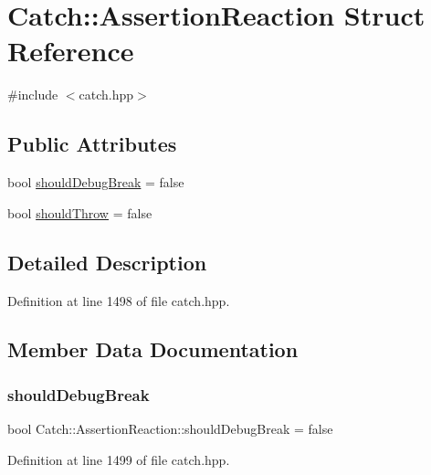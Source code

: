 \hypertarget{struct_catch_1_1_assertion_reaction}{}\section{Catch\+:\+:Assertion\+Reaction Struct Reference}
\label{struct_catch_1_1_assertion_reaction}


{\ttfamily \#include $<$catch.\+hpp$>$}

\subsection*{Public Attributes}
\begin{DoxyCompactItemize}
\item 
bool \mbox{\hyperlink{struct_catch_1_1_assertion_reaction_adcf30fb90ff20d9789df78d424652497}{should\+Debug\+Break}} = false
\item 
bool \mbox{\hyperlink{struct_catch_1_1_assertion_reaction_a82c8d95a2c1b6a331bde66982a8e090f}{should\+Throw}} = false
\end{DoxyCompactItemize}


\subsection{Detailed Description}


Definition at line 1498 of file catch.\+hpp.



\subsection{Member Data Documentation}
\mbox{\label{struct_catch_1_1_assertion_reaction_adcf30fb90ff20d9789df78d424652497}} 
\subsubsection{\texorpdfstring{should\+Debug\+Break}{shouldDebugBreak}}
{\footnotesize\ttfamily bool Catch\+::\+Assertion\+Reaction\+::should\+Debug\+Break = false}



Definition at line 1499 of file catch.\+hpp.

